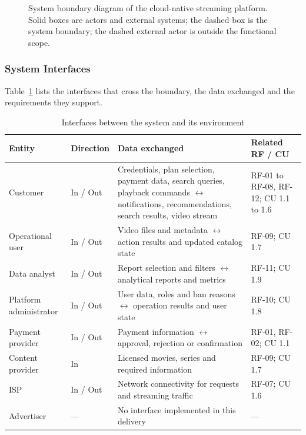 \documentclass{article}
\begin{document}
\begin{figure}[H]
{%
}
\caption{System boundary diagram of the cloud-native streaming platform. Solid boxes are actors and external systems; the dashed box is the system boundary; the dashed external actor is outside the functional scope.}
\label{fig:system-boundary}
\end{figure}
 
\subsubsection{System Interfaces}
 
Table~\ref{tab:interfaces} lists the interfaces that cross the boundary, the data exchanged and the requirements they support.
 
\begin{table}[H]
\centering
\caption{Interfaces between the system and its environment}
\label{tab:interfaces}
\small
\renewcommand{\arraystretch}{1.25}
\begin{tabularx}{\textwidth}{@{}p{3cm}p{2.2cm}Xp{2.3cm}@{}}
\toprule
\textbf{Entity} & \textbf{Direction} & \textbf{Data exchanged} & \textbf{Related RF / CU} \\
\midrule
Customer & In / Out & Credentials, plan selection, payment data, search queries, playback commands $\leftrightarrow$ notifications, recommendations, search results, video stream & RF-01 to RF-08, RF-12; CU 1.1 to 1.6 \\
Operational user & In / Out & Video files and metadata $\leftrightarrow$ action results and updated catalog state & RF-09; CU 1.7 \\
Data analyst & In / Out & Report selection and filters $\leftrightarrow$ analytical reports and metrics & RF-11; CU 1.9 \\
Platform administrator & In / Out & User data, roles and ban reasons $\leftrightarrow$ operation results and user state & RF-10; CU 1.8 \\
Payment provider & In / Out & Payment information $\leftrightarrow$ approval, rejection or confirmation & RF-01, RF-02; CU 1.1 \\
Content provider & In & Licensed movies, series and required information & RF-09; CU 1.7 \\
ISP & In / Out & Network connectivity for requests and streaming traffic & RF-07; CU 1.6 \\
Advertiser & --- & No interface implemented in this delivery & --- \\
\bottomrule
\end{tabularx}
\end{table}
 
\end{document}
